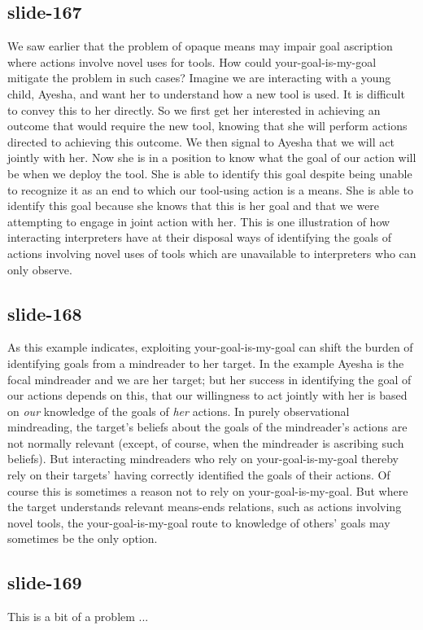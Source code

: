 \documentclass[12pt,\papersize]{extarticle}
\begin{document}
\subsection{slide-167}
We saw earlier that the problem of opaque means  may impair goal
ascription where actions involve novel uses for tools.
How could your-goal-is-my-goal mitigate the problem in such cases?
Imagine we are interacting with a young child,
Ayesha,
and want her to understand how a new tool is used.
It is difficult to convey this to her directly.
So we first get her interested in achieving an outcome that would require the new tool,
knowing that she will perform actions directed to achieving this outcome.
We then signal to Ayesha that we will act jointly with her.
Now she is in a position to know what the goal of our action will be when we deploy the tool.
She is able to identify this goal
despite being unable to recognize it as an end to which our tool-using action is a means.
She is able to identify this goal
because she knows that this is her goal
and that we were attempting to engage in joint action with her.
This is one illustration of how
interacting interpreters have at their disposal ways of
identifying the goals of actions involving novel uses of tools
which are unavailable to interpreters who can only observe.

\subsection{slide-168}
As this example indicates,
exploiting your-goal-is-my-goal
can shift the burden of identifying goals from a mindreader to her target.
In the example Ayesha is the focal mindreader and we are her target;
but her success in identifying the goal of our actions
depends on this,
that our willingness to act jointly with her is based on \emph{our} knowledge of the goals of \emph{her} actions.
In purely observational mindreading, the target's beliefs about the goals of the mindreader's actions are not normally relevant (except, of course, when the mindreader is ascribing such beliefs).
But interacting mindreaders who rely on your-goal-is-my-goal
thereby rely on their targets' having correctly identified the goals of their actions.
Of course this is sometimes a reason not to rely on your-goal-is-my-goal.
But where the target understands relevant means-ends relations,
such as actions involving novel tools,
the your-goal-is-my-goal route to knowledge of others' goals may sometimes be the only option.

\subsection{slide-169}
This is a bit of a problem ...
\end{document}
